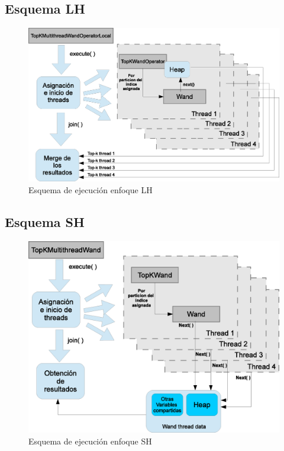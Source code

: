 \subsection{Esquema LH}
\label{evaluacionexperimental:esquemalh}

\begin{figure}[th!]
\centering
\includegraphics[scale=.75]{images/ejecucion_topkmultithreadwandopLOCAL.eps}
\caption{Esquema de ejecución enfoque LH}
\label{fig:esquema_ejecucion_wandlh}
\end{figure}



\subsection{Esquema SH}
\label{evaluacionexperimental:esquemash}

\begin{figure}[th!]
\centering
\includegraphics[scale=.75]{images/ejecucion_topkmultithreadwandopCOMPARTIDO.eps}
\caption{Esquema de ejecución enfoque SH}
\label{fig:esquema_ejecucion_wandsh}
\end{figure}












